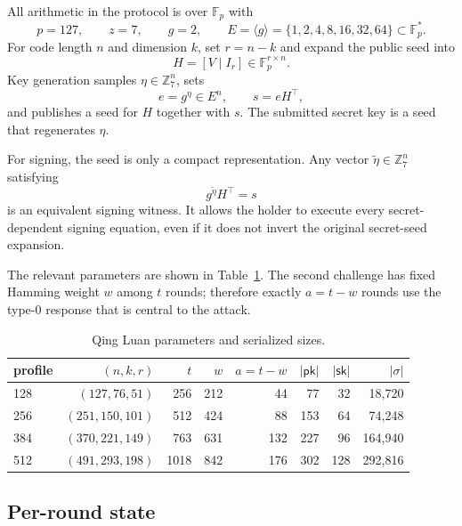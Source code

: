\documentclass[11pt,a4paper]{article}
\newcommand{\F}{\mathbb F}
\newcommand{\Z}{\mathbb Z}
\newcommand{\pk}{\ensuremath{\mathsf{pk}}}
\newcommand{\sk}{\ensuremath{\mathsf{sk}}}
\begin{document}
All arithmetic in the protocol is over $\F_p$ with
\[
 p=127,\qquad z=7,\qquad g=2,\qquad
 E=\langle g\rangle=\{1,2,4,8,16,32,64\}\subset\F_p^*.
\]
For code length $n$ and dimension $k$, set $r=n-k$ and expand the
public seed into
\[
                  H=[V\mid I_r]\in\F_p^{r\times n}.
\]
Key generation samples $\eta\in\Z_7^n$, sets
\begin{equation}
              e=g^\eta\in E^n,\qquad s=eH^\top,             \label{eq:public}
\end{equation}
and publishes a seed for $H$ together with $s$.  The submitted secret key is a
seed that regenerates $\eta$.

For signing, the seed is only a compact representation.  Any vector
$\widetilde\eta\in\Z_7^n$ satisfying
\begin{equation}
                  g^{\widetilde\eta}H^\top=s               \label{eq:witness}
\end{equation}
is an equivalent signing witness.  It allows the holder to execute every
secret-dependent signing equation, even if it does not invert the original
secret-seed expansion.

The relevant parameters are shown in Table~\ref{tab:params}.  The second
challenge has fixed Hamming weight $w$ among $t$ rounds; therefore exactly
$a=t-w$ rounds use the type-0 response that is central to the attack.

\begin{table}[ht]
\centering
\caption{Qing Luan parameters and serialized sizes.}
\label{tab:params}
\begin{tabular}{lrrrrrrr}
\toprule
profile & $(n,k,r)$ & $t$ & $w$ & $a=t-w$ & $|\pk|$ & $|\sk|$ & $|\sigma|$\\
\midrule
128 & $(127,76,51)$   & 256  & 212 & 44  & 77  & 32  & 18,720\\
256 & $(251,150,101)$ & 512  & 424 & 88  & 153 & 64  & 74,248\\
384 & $(370,221,149)$ & 763  & 631 & 132 & 227 & 96  & 164,940\\
512 & $(491,293,198)$ & 1018 & 842 & 176 & 302 & 128 & 292,816\\
\bottomrule
\end{tabular}
\end{table}

\subsection{Per-round state}
\end{document}
